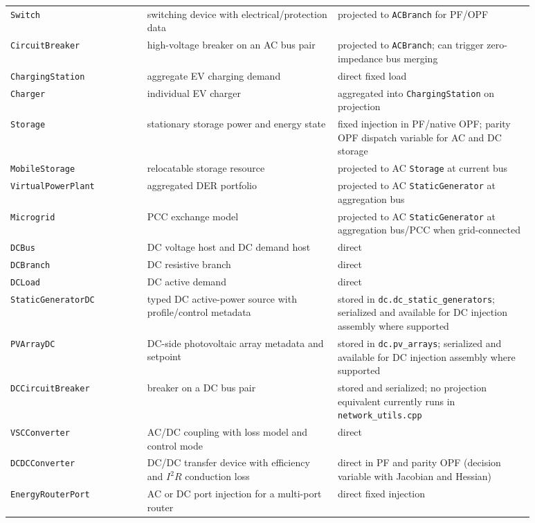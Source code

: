 \begin{longtable}{L{0.23\linewidth}L{0.32\linewidth}L{0.33\linewidth}}
\texttt{Switch} & switching device with electrical/protection data & projected to \texttt{ACBranch} for PF/OPF \\
\texttt{CircuitBreaker} & high-voltage breaker on an AC bus pair & projected to \texttt{ACBranch}; can trigger zero-impedance bus merging \\
\texttt{ChargingStation} & aggregate EV charging demand & direct fixed load \\
\texttt{Charger} & individual EV charger & aggregated into \texttt{ChargingStation} on projection \\
\texttt{Storage} & stationary storage power and energy state & fixed injection in PF/native OPF; parity OPF dispatch variable for AC and DC storage \\
\texttt{MobileStorage} & relocatable storage resource & projected to AC \texttt{Storage} at current bus \\
\texttt{VirtualPowerPlant} & aggregated DER portfolio & projected to AC \texttt{StaticGenerator} at aggregation bus \\
\texttt{Microgrid} & PCC exchange model & projected to AC \texttt{StaticGenerator} at aggregation bus/PCC when grid-connected \\
\texttt{DCBus} & DC voltage host and DC demand host & direct \\
\texttt{DCBranch} & DC resistive branch & direct \\
\texttt{DCLoad} & DC active demand & direct \\
\texttt{StaticGeneratorDC} & typed DC active-power source with profile/control metadata & stored in \texttt{dc.dc\_static\_generators}; serialized and available for DC injection assembly where supported \\
\texttt{PVArrayDC} & DC-side photovoltaic array metadata and setpoint & stored in \texttt{dc.pv\_arrays}; serialized and available for DC injection assembly where supported \\
\texttt{DCCircuitBreaker} & breaker on a DC bus pair & stored and serialized; no projection equivalent currently runs in \texttt{network\_utils.cpp} \\
\texttt{VSCConverter} & AC/DC coupling with loss model and control mode & direct \\
\texttt{DCDCConverter} & DC/DC transfer device with efficiency and \(I^2R\) conduction loss & direct in PF and parity OPF (decision variable with Jacobian and Hessian) \\
\texttt{EnergyRouterPort} & AC or DC port injection for a multi-port router & direct fixed injection \\

\end{longtable}
